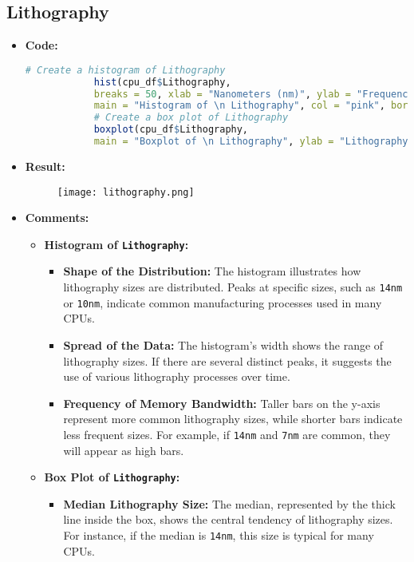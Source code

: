 \documentclass{article}
\begin{document}
	\subsection{Lithography}
	\begin{itemize}
		\item \textbf{Code:}
		\begin{lstlisting}[basicstyle=\ttfamily, frame=single,language=R]
			# Create a histogram of Lithography
			hist(cpu_df$Lithography, 
			breaks = 50, xlab = "Nanometers (nm)", ylab = "Frequency", 
			main = "Histogram of \n Lithography", col = "pink", border = "black")
			# Create a box plot of Lithography
			boxplot(cpu_df$Lithography, 
			main = "Boxplot of \n Lithography", ylab = "Lithography (nm)", col = "lightblue", border = "black")
		\end{lstlisting}
		\item \textbf{Result:}
		\begin{figure}[h]
			\centering
			\texttt{[image: lithography.png]}    %
			\label{fig:enter-label}
		\end{figure}
		\item \textbf{Comments:}
		\begin{itemize}
			\item \textbf{Histogram of \texttt{Lithography}:}
			\begin{itemize}
				\item \textbf{Shape of the Distribution:} The histogram illustrates how lithography sizes are distributed. Peaks at specific sizes, such as \texttt{14nm} or \texttt{10nm}, indicate common manufacturing processes used in many CPUs.
				\item \textbf{Spread of the Data:} The histogram’s width shows the range of lithography sizes. If there are several distinct peaks, it suggests the use of various lithography processes over time.
				\item \textbf{Frequency of Memory Bandwidth:} Taller bars on the y-axis represent more common lithography sizes, while shorter bars indicate less frequent sizes. For example, if \texttt{14nm} and \texttt{7nm} are common, they will appear as high bars.
			\end{itemize}
			\item \textbf{Box Plot of \texttt{Lithography}:}
			\begin{itemize}
				\item \textbf{Median Lithography Size:} The median, represented by the thick line inside the box, shows the central tendency of lithography sizes. For instance, if the median is \texttt{14nm}, this size is typical for many CPUs.

\end{itemize}
\end{itemize}
\end{itemize}
\end{document}
